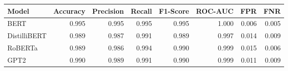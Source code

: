 \begin{tabular}{|l||r|r|r|r|r|r|r|}
\toprule
Model & \textbf{Accuracy} & \textbf{Precision} & Recall & \textbf{F1-Score} & \textbf{ROC-AUC} & \textbf{FPR} & FNR \\
\midrule \midrule
BERT & 0.995 & 0.995 & 0.995 & 0.995 & 1.000 & 0.006 & 0.005 \\
DistilliBERT & 0.989 & 0.987 & 0.991 & 0.989 & 0.997 & 0.014 & 0.009 \\
RoBERTa & 0.989 & 0.986 & 0.994 & 0.990 & 0.999 & 0.015 & 0.006 \\
GPT2 & 0.990 & 0.989 & 0.991 & 0.990 & 0.999 & 0.011 & 0.009 \\
\bottomrule
\end{tabular}
